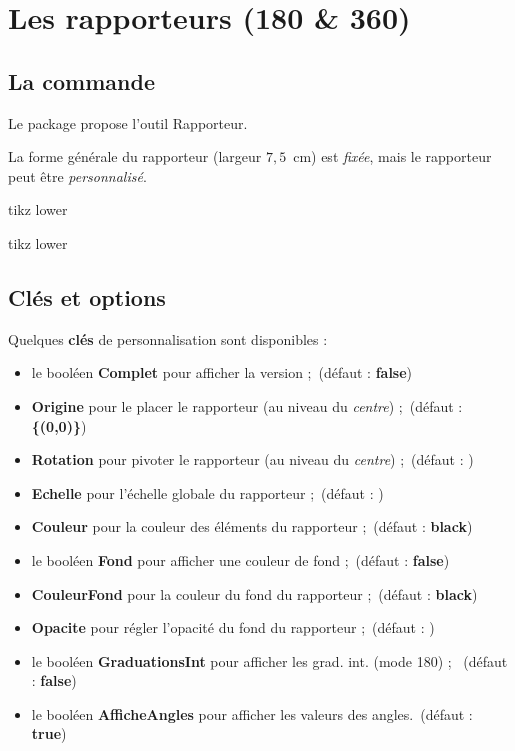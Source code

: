 \documentclass[french,a4paper,11pt]{article}
\newcommand\Cle[1]{{\bfseries\sffamily\textlangle #1\textrangle}}
\begin{document}
\pagebreak

\section{Les rapporteurs (180 \&{} 360)}

\subsection{La commande}

\begin{cautionblock}
Le package propose l'outil \textsf{Rapporteur}.

La forme générale du rapporteur (largeur $7,5$~cm) est \textit{fixée}, mais le rapporteur peut être \textit{personnalisé}.
\end{cautionblock}

\begin{PresentationCode}{tikz lower}
\tkzRapporteur
\end{PresentationCode}

\begin{PresentationCode}{tikz lower}
\tkzRapporteur[Complet]
\end{PresentationCode}

\subsection{Clés et options}

\begin{tipblock}
Quelques \Cle{clés} de personnalisation sont disponibles :

\begin{itemize}
	\item le booléen \Cle{Complet} pour afficher la version  \fg{};\hfill~(défaut : \Cle{false})
	\item \Cle{Origine} pour le placer le rapporteur (au niveau du \textit{centre}) ;\hfill~(défaut : \Cle{\{(0,0)\}})
	\item \Cle{Rotation} pour pivoter le rapporteur (au niveau du \textit{centre}) ;\hfill~(défaut : \Cle{0})
	\item \Cle{Echelle} pour l'échelle globale du rapporteur ;\hfill~(défaut : \Cle{1})
	\item \Cle{Couleur} pour la couleur des éléments du rapporteur ;\hfill~(défaut : \Cle{black})
	\item le booléen \Cle{Fond} pour afficher une couleur de fond ;\hfill~(défaut : \Cle{false})
	\item \Cle{CouleurFond} pour la couleur du fond du rapporteur ;\hfill~(défaut : \Cle{black})
	\item \Cle{Opacite} pour régler l'opacité du fond du rapporteur ;\hfill~(défaut : \Cle{0.5})
	\item le booléen \Cle{GraduationsInt} pour afficher les grad. int. (mode 180) ; \hfill~(défaut : \Cle{false})
	\item le booléen \Cle{AfficheAngles} pour afficher les valeurs des angles.\hfill~(défaut : \Cle{true})
\end{itemize}
\vspace*{-\baselineskip}\leavevmode
\end{tipblock}
\end{document}
